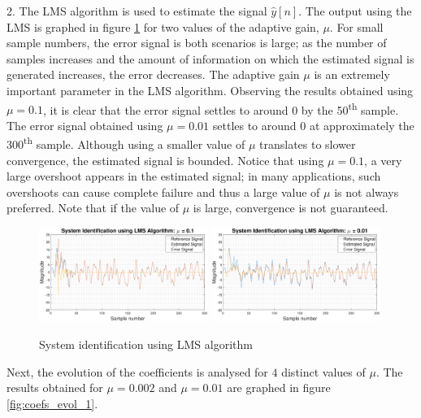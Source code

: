 \documentclass{article}
\begin{document}
2. The LMS algorithm is used to estimate the signal $\hat{y}[n]$. The output using the LMS is graphed in figure \ref{fig:lms} for two values of the adaptive gain, $\mu$. For small sample numbers, the error signal is both scenarios is large; as the number of samples increases and the amount of information on which the estimated signal is generated increases, the error decreases. The adaptive gain $\mu$ is an extremely important parameter in the LMS algorithm. Observing the results obtained using $\mu = 0.1$, it is clear that the error signal settles to around 0 by the 50\textsuperscript{th} sample. The error signal obtained using $\mu = 0.01$ settles to around 0 at approximately the 300\textsuperscript{th} sample. Although using a smaller value of $\mu$ translates to slower convergence, the estimated signal is bounded. Notice that using $\mu = 0.1$, a very large overshoot appears in the estimated signal; in many applications, such overshoots can cause complete failure and thus a large value of $\mu$ is not always preferred. Note that if the value of $\mu$ is large, convergence is not guaranteed.

\begin{figure}[H]
    \centering
    \includegraphics[width=0.49\textwidth]{lms_mu_point_1}
    \includegraphics[width=0.49\textwidth]{lms_mu_point_01}
    \caption{System identification using LMS algorithm}
    \label{fig:lms}
\end{figure}

\newpage
Next, the evolution of the coefficients is analysed for $4$ distinct values of $\mu$. The results obtained for $\mu = 0.002$ and $\mu = 0.01$ are graphed in figure \ref{fig:coefs_evol_1}.
\end{document}
